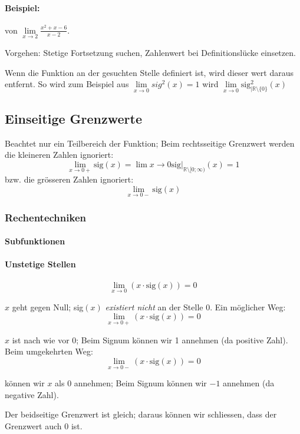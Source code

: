 \paragraph{Beispiel:} von $\lim\limits_{x \to 2}{\frac{x^2 + x -6}{x-2}}$.

Vorgehen: Stetige Fortsetzung suchen, Zahlenwert bei Definitionslücke  einsetzen.


Wenn die Funktion an der gesuchten Stelle definiert ist, wird dieser wert daraus entfernt. So wird zum Beispiel aus $\lim\limits_{x \to 0}{sig^2(x)} = 1$ wird $\lim\limits_{x \to 0}{\text{sig}^2_{|\mathbb{R} \setminus \{0\}}(x)}$

\subsection{Einseitige Grenzwerte}

	Beachtet nur ein Teilbereich der Funktion; Beim rechtsseitige Grenzwert werden die kleineren Zahlen ignoriert:
\[
	\lim\limits_{x \to 0+}{\text{sig}(x)} = \lim\limits{x \to 0} \text{sig}|_{\mathbb{R} \setminus [0;\infty)}(x) = 1
\]
bzw. die grösseren Zahlen ignoriert:
\[
	\lim\limits_{x \to 0-}{\text{sig}(x)}
\]

\subsubsection{Rechentechniken}

\paragraph{Subfunktionen}

\paragraph{Unstetige Stellen}

\[
	\lim\limits_{x \to 0}(x \cdot \text{sig}(x)) = 0
\]

$x$ geht gegen Null; sig$(x)$ \emph{existiert nicht} an der Stelle 0. Ein möglicher Weg:
\[
	\lim\limits_{x \to 0+}(x \cdot \text{sig}(x)) = 0
\]

$x$ ist nach wie vor 0; Beim Signum können wir 1 annehmen (da positive Zahl). Beim umgekehrten Weg:
\[
	\lim\limits_{x \to 0-}(x \cdot \text{sig}(x)) = 0
\]

können wir $x$ als 0 annehmen; Beim Signum können wir $-1$ annehmen (da negative Zahl).

Der beidseitige Grenzwert ist gleich; daraus können wir schliessen, dass der Grenzwert auch $0$ ist.

